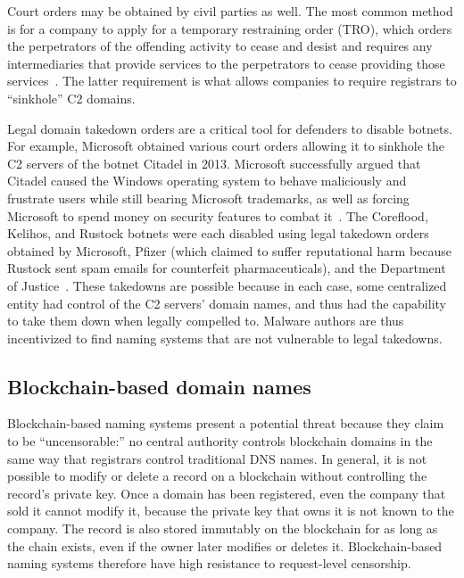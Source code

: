 \documentclass[10pt,sigconf,letterpaper]{acmart}
\begin{document}
Court orders may be obtained by civil parties as well. The most common method is for a company to 
apply for a temporary restraining order (TRO), which orders the perpetrators of the offending 
activity to cease and desist and requires any intermediaries that provide services to the 
perpetrators to cease providing those services~\cite{kesari_deterring_2017}. The latter requirement 
is what allows companies to require registrars to ``sinkhole'' C2 domains. 

Legal domain takedown orders are a critical tool for defenders to disable botnets. For example, 
Microsoft obtained various court orders allowing it to sinkhole the C2 servers of the botnet 
Citadel in 2013. Microsoft successfully argued that Citadel caused the Windows operating system to 
behave maliciously and frustrate users while still bearing Microsoft trademarks, as well as forcing 
Microsoft to spend money on security features to combat it~\cite{lerner_microsoft_2014}. The 
Coreflood, Kelihos, and Rustock botnets were each disabled using legal takedown orders obtained by 
Microsoft, Pfizer (which claimed to suffer reputational harm because Rustock sent spam emails for 
counterfeit pharmaceuticals), and the Department of Justice~\cite{kesari_deterring_2017}. These 
takedowns are possible because in each case, some centralized entity had control of the C2 servers' 
domain names, and thus had the capability to take them down when legally compelled to. Malware 
authors are thus incentivized to find naming systems that are not vulnerable to legal takedowns.  

\subsection{Blockchain-based domain names}

Blockchain-based naming systems present a potential threat 
because they claim to be ``uncensorable:'' no central authority 
controls blockchain domains in the same way that registrars 
control traditional DNS names. In general, it is not possible to modify or 
delete a record on a blockchain without controlling the record's private key. Once a domain has 
been registered, even the company that sold it 
cannot modify it, because the private key that owns it is not known to the company. The record is 
also stored immutably on the blockchain for as long as the chain 
exists, even if the owner later modifies or deletes it. Blockchain-based naming systems therefore 
have high resistance to request-level censorship.
\end{document}
